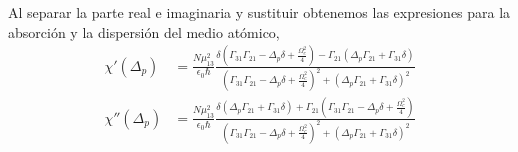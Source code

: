 Al separar la parte real e imaginaria y sustituir obtenemos las expresiones para la absorción y la dispersión del medio atómico,
\begin{subequations}
\begin{align}
    \chi'(\Delta_p) &= \frac{N \mu_{13}^2}{\epsilon_0 \hbar}\frac{\delta \left( \Gamma_{31}\Gamma_{21} - \Delta_p\delta + \frac{\Omega_c^2}{4}\right) - \Gamma_{21} \left(\Delta_p\Gamma_{21} + \Gamma_{31}\delta\right)}{\left(\Gamma_{31}\Gamma_{21} - \Delta_p\delta + \frac{\Omega_c^2}{4} \right)^2 + \left(\Delta_p\Gamma_{21} + \Gamma_{31}\delta\right)^2}\\
    \chi''(\Delta_p) &= \frac{N \mu_{13}^2}{\epsilon_0 \hbar}\frac{\delta \left( \Delta_p\Gamma_{21} + \Gamma_{31}\delta \right) + \Gamma_{21} \left(\Gamma_{31}\Gamma_{21} - \Delta_p\delta + \frac{\Omega_c^2}{4} \right)}{\left( \Gamma_{31}\Gamma_{21} - \Delta_p\delta + \frac{\Omega_c^2}{4} \right)^2 + \left(\Delta_p\Gamma_{21} + \Gamma_{31}\delta\right)^2}
\end{align}
\end{subequations}

